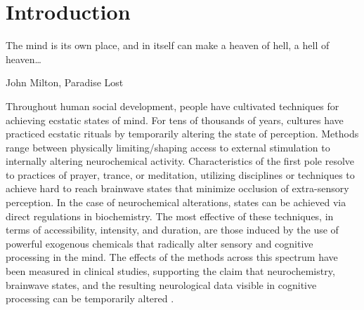 \documentclass{UIdahoMastersThesis}
\begin{document}
\mainmatter  %
\setcounter{secnumdepth}{3}  %




\clearpage
\chapter{Introduction}
\label{Chapter:Introduction}

\acresetall  %

\epigraph {The mind is its own place, and in itself can make a heaven of hell, a hell of heaven\ldots}{John Milton, Paradise Lost}

Throughout human social development, people have cultivated techniques for achieving ecstatic states of mind. For tens of thousands of years, cultures have practiced ecstatic rituals by temporarily altering the state of perception. Methods range between physically limiting/shaping access to external stimulation to internally altering neurochemical activity. Characteristics of the first pole resolve to practices of prayer, trance, or meditation, utilizing disciplines or techniques to achieve hard to reach brainwave states that minimize occlusion of extra-sensory perception. In the case of neurochemical alterations, states can be achieved via direct regulations in biochemistry. The most effective of these techniques, in terms of accessibility, intensity, and duration, are those induced by the use of powerful exogenous chemicals that radically alter sensory and cognitive processing in the mind. The effects of the methods across this spectrum have been measured in clinical studies, supporting the claim that neurochemistry, brainwave states, and the resulting neurological data visible in cognitive processing can be temporarily altered \cite{carhart-harris_neural_2012}\cite{michael_r._hagerty_case_2013}.
\end{document}
